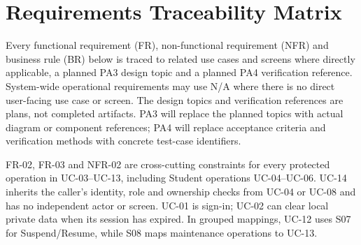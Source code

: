 \section{Requirements Traceability Matrix}

Every functional requirement (FR), non-functional requirement (NFR) and business rule (BR) below is traced to related use cases and screens where directly applicable, a planned PA3 design topic and a planned PA4 verification reference. System-wide operational requirements may use N/A where there is no direct user-facing use case or screen. The design topics and verification references are plans, not completed artifacts. PA3 will replace the planned topics with actual diagram or component references; PA4 will replace acceptance criteria and verification methods with concrete test-case identifiers.

FR-02, FR-03 and NFR-02 are cross-cutting constraints for every protected operation in UC-03--UC-13, including Student operations UC-04--UC-06. UC-14 inherits the caller's identity, role and ownership checks from UC-04 or UC-08 and has no independent actor or screen. UC-01 is sign-in; UC-02 can clear local private data when its session has expired. In grouped mappings, UC-12 uses S07 for Suspend/Resume, while S08 maps maintenance operations to UC-13.

